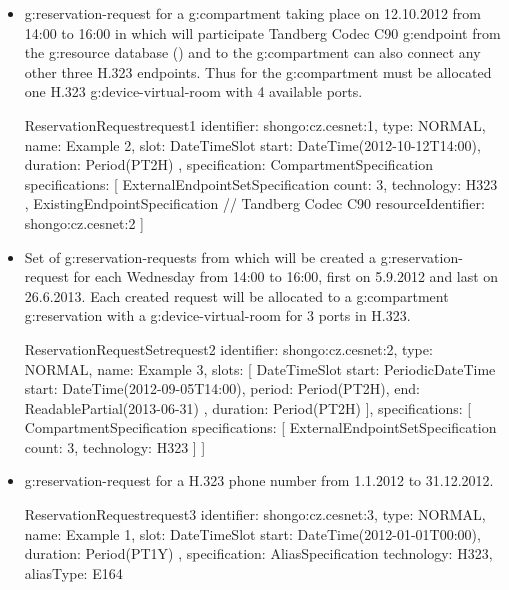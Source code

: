 \begin{itemize}

\item \Gls{g:reservation-request} for a \gls{g:compartment} taking place on 12.10.2012 from 14:00 to 16:00 in which will participate Tandberg Codec C90 \gls{g:endpoint} from the \gls{g:resource} database () and to the \gls{g:compartment} can also connect any other three H.323 endpoints. Thus for the \gls{g:compartment} must be allocated one H.323 \gls{g:device-virtual-room} with 4 available ports.

\label{oc:request1}
\begin{ObjectCode}{ReservationRequest}{request1}{}
identifier: shongo:cz.cesnet:1,
type: NORMAL,
name: Example 2,
slot: DateTimeSlot {
  start: DateTime(2012-10-12T14:00),
  duration: Period(PT2H)
},
specification: CompartmentSpecification {
  specifications: [
    ExternalEndpointSetSpecification {
      count: 3,
      technology: H323
    },
    ExistingEndpointSpecification { // Tandberg Codec C90
      resourceIdentifier: shongo:cz.cesnet:2
    }
  ]
}
\end{ObjectCode}

\item Set of \glspl{g:reservation-request} from which will be created a \gls{g:reservation-request} for each Wednesday from 14:00 to 16:00, first on 5.9.2012 and last on 26.6.2013. Each created request will be allocated to a \gls{g:compartment} \gls{g:reservation} with a \gls{g:device-virtual-room} for 3 ports in H.323.

\label{oc:request2}
\begin{ObjectCode}{ReservationRequestSet}{request2}{}
identifier: shongo:cz.cesnet:2,
type: NORMAL,
name: Example 3,
slots: [
  DateTimeSlot {
    start: PeriodicDateTime{
      start: DateTime(2012-09-05T14:00),
      period: Period(PT2H),
      end: ReadablePartial(2013-06-31)
    },
    duration: Period(PT2H)
  }
],
specifications: [
  CompartmentSpecification {
    specifications: [
      ExternalEndpointSetSpecification {
        count: 3,
        technology: H323
      }
    ]
  }
]
\end{ObjectCode}

\item \Gls{g:reservation-request} for a H.323 phone number from 1.1.2012 to 31.12.2012.

\label{oc:request3}
\begin{ObjectCode}{ReservationRequest}{request3}{}
identifier: shongo:cz.cesnet:3,
type: NORMAL,
name: Example 1,
slot: DateTimeSlot {
  start: DateTime(2012-01-01T00:00),
  duration: Period(PT1Y)
},
specification: AliasSpecification {
  technology: H323,
  aliasType: E164
}
\end{ObjectCode}

\end{itemize}


